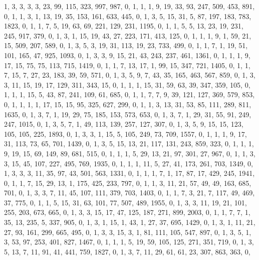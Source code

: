 \begin{code}
\begin{hide}
{     {1, 3, 3, 3, 3, 23, 99, 115, 323, 997, 987, 0},
     {1, 1, 1, 9, 19, 33, 93, 247, 509, 453, 891, 0},
     {1, 1, 3, 1, 13, 19, 35, 153, 161, 633, 445, 0},
     {1, 3, 5, 15, 31, 5, 87, 197, 183, 783, 1823, 0},
     {1, 1, 7, 5, 19, 63, 69, 221, 129, 231, 1195, 0},
     {1, 1, 5, 5, 13, 23, 19, 231, 245, 917, 379, 0},
     {1, 3, 1, 15, 19, 43, 27, 223, 171, 413, 125, 0},
     {1, 1, 1, 9, 1, 59, 21, 15, 509, 207, 589, 0},
     {1, 3, 5, 3, 19, 31, 113, 19, 23, 733, 499, 0},
     {1, 1, 7, 1, 19, 51, 101, 165, 47, 925, 1093, 0},
     {1, 3, 3, 9, 15, 21, 43, 243, 237, 461, 1361, 0},
     {1, 1, 1, 9, 17, 15, 75, 75, 113, 715, 1419, 0},
     {1, 1, 7, 13, 17, 1, 99, 15, 347, 721, 1405, 0},
     {1, 1, 7, 15, 7, 27, 23, 183, 39, 59, 571, 0},
     {1, 3, 5, 9, 7, 43, 35, 165, 463, 567, 859, 0},
     {1, 3, 3, 11, 15, 19, 17, 129, 311, 343, 15, 0},
     {1, 1, 1, 15, 31, 59, 63, 39, 347, 359, 105, 0},
     {1, 1, 1, 15, 5, 43, 87, 241, 109, 61, 685, 0},
     {1, 1, 7, 7, 9, 39, 121, 127, 369, 579, 853, 0},
     {1, 1, 1, 1, 17, 15, 15, 95, 325, 627, 299, 0},
     {1, 1, 3, 13, 31, 53, 85, 111, 289, 811, 1635, 0},
     {1, 3, 7, 1, 19, 29, 75, 185, 153, 573, 653, 0},
     {1, 3, 7, 1, 29, 31, 55, 91, 249, 247, 1015, 0},
     {1, 3, 5, 7, 1, 49, 113, 139, 257, 127, 307, 0},
     {1, 3, 5, 9, 15, 15, 123, 105, 105, 225, 1893, 0},
     {1, 3, 3, 1, 15, 5, 105, 249, 73, 709, 1557, 0},
     {1, 1, 1, 9, 17, 31, 113, 73, 65, 701, 1439, 0},
     {1, 3, 5, 15, 13, 21, 117, 131, 243, 859, 323, 0},
     {1, 1, 1, 9, 19, 15, 69, 149, 89, 681, 515, 0},
     {1, 1, 1, 5, 29, 13, 21, 97, 301, 27, 967, 0},
     {1, 1, 3, 3, 15, 45, 107, 227, 495, 769, 1935, 0},
     {1, 1, 1, 11, 5, 27, 41, 173, 261, 703, 1349, 0},
     {1, 3, 3, 3, 11, 35, 97, 43, 501, 563, 1331, 0},
     {1, 1, 1, 7, 1, 17, 87, 17, 429, 245, 1941, 0},
     {1, 1, 7, 15, 29, 13, 1, 175, 425, 233, 797, 0},
     {1, 1, 3, 11, 21, 57, 49, 49, 163, 685, 701, 0},
     {1, 3, 3, 7, 11, 45, 107, 111, 379, 703, 1403, 0},
     {1, 1, 7, 3, 21, 7, 117, 49, 469, 37, 775, 0},
     {1, 1, 5, 15, 31, 63, 101, 77, 507, 489, 1955, 0},
     {1, 3, 3, 11, 19, 21, 101, 255, 203, 673, 665, 0},
     {1, 3, 3, 15, 17, 47, 125, 187, 271, 899, 2003, 0},
     {1, 1, 7, 7, 1, 35, 13, 235, 5, 337, 905, 0},
     {1, 3, 1, 15, 1, 43, 1, 27, 37, 695, 1429, 0},
     {1, 3, 1, 11, 21, 27, 93, 161, 299, 665, 495, 0},
     {1, 3, 3, 15, 3, 1, 81, 111, 105, 547, 897, 0},
     {1, 3, 5, 1, 3, 53, 97, 253, 401, 827, 1467, 0},
     {1, 1, 1, 5, 19, 59, 105, 125, 271, 351, 719, 0},
     {1, 3, 5, 13, 7, 11, 91, 41, 441, 759, 1827, 0},
     {1, 3, 7, 11, 29, 61, 61, 23, 307, 863, 363, 0},
}
\end{hide}
\end{code}
